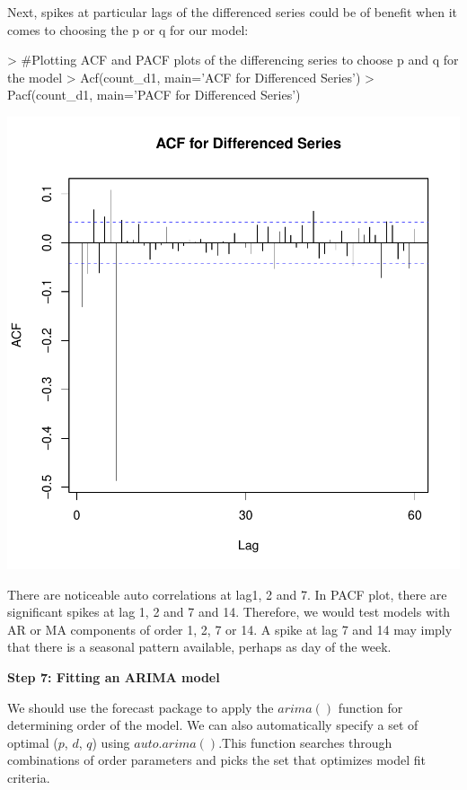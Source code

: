 \documentclass{article}
\begin{document}
Next, spikes at particular lags of the differenced series could be of benefit when it comes to choosing the p or q for our model:
\begin{Schunk}
\begin{Sinput}
> #Plotting ACF and PACF plots of the differencing series to choose p and q for the model
> Acf(count_d1, main='ACF for Differenced Series')
> Pacf(count_d1, main='PACF for Differenced Series')
\end{Sinput}
\end{Schunk}
\includegraphics{Report-016}


There are noticeable auto correlations at lag1, 2 and 7. In PACF plot, there are significant spikes at lag 1, 2 and 7 and 14. Therefore, we would test models with AR or MA components of order 1, 2, 7 or 14. A spike at lag 7 and 14 may imply that there is a seasonal pattern available, perhaps as day of the week. 

\textbf{Step 7: Fitting an ARIMA model}

We should use the forecast package to apply the $arima()$ function for determining order of the model. We can also automatically specify a set of optimal ($p$, $d$, $q$) using $auto.arima()$.This function searches through combinations of order parameters and picks the set that optimizes model fit criteria.
\end{document}
